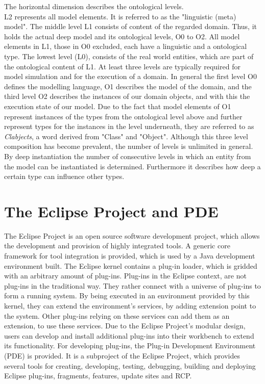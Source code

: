 The horizontal dimension describes the ontological levels.\\ L2 represents all model elements. It is referred to as the "linguistic (meta) model". The middle level L1 consists of content of the regarded domain. Thus, it holds the actual deep model and its ontological levels, O0 to O2. All model elements in L1, those in O0 excluded, each have a linguistic and a ontological type.  The lowest level (L0), consists of the real world entities, which are part of the ontological content of L1. At least three levels are typically required for model simulation and for the execution of a domain. In general the first level O0 defines the modelling language, O1 describes the model of the domain, and the third level O2 describes the instances of our domain objects, and with this the execution state of our model. Due to the fact that model elements of O1 represent instances of the types from the ontological level above and further represent types for the instances in the level underneath, they are referred to as \textit{Clabjects}, a word derived from "Class" and "Object".
Although this three level composition has become prevalent, the number of levels is unlimited in general. By deep instantiation the number of consecutive levels in which an entity from the model can be instantiated is determined. Furthermore it describes how deep a certain type can influence other types.

\section{The Eclipse Project and PDE}
The Eclipse Project is an open source software development project, which allows the development and provision of highly integrated tools.
A generic core framework for tool integration is provided, which is used by a Java development environment built. The Eclipse kernel contains a plug-in loader, which is gridded with an arbitrary amount of plug-ins. Plug-ins in the Eclipse context, are not plug-ins in the traditional way. They rather connect with a universe of plug-ins to form a running system. By being executed in an environment provided by this kernel, they can extend the environment’s services, by adding extension point to the system. Other plug-ins relying on these services can add them as an extension, to use these services. Due to the Eclipse Project's modular design, users can develop and install additional plug-ins into their workbench to extend its functionality. For developing plug-ins, the Plug-in Development Environment (PDE) is provided. It is a subproject of the Eclipse Project, which provides several tools for creating, developing, testing, debugging, building and deploying Eclipse plug-ins, fragments, features, update sites and RCP.
